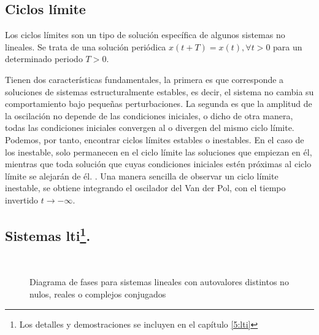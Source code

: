 \subsection{Ciclos límite}
Los ciclos límites son un tipo de solución específica de algunos sistemas no lineales. Se trata de una solución periódica $x(t+T) =x(t), \forall t>0$ para un determinado periodo  $T>0$. 

Tienen dos características fundamentales, la primera es que corresponde a soluciones de sistemas estructuralmente estables, es decir, el sistema no cambia su comportamiento bajo pequeñas perturbaciones. La segunda es que la amplitud de la oscilación no depende de las condiciones iniciales, o dicho  de otra manera, todas las condiciones iniciales convergen al o divergen del mismo ciclo límite. Podemos, por tanto, encontrar ciclos límites estables o inestables. En el caso de los inestable, solo permanecen en el ciclo límite las soluciones que empiezan en él, mientras que toda solución que cuyas condiciones iniciales estén próximas al ciclo límite se alejarán de él. . Una manera sencilla de observar un ciclo límite inestable, se obtiene integrando el oscilador del Van der Pol, con el tiempo invertido $t\to -\infty$.





\subsection{Sistemas lti\protect\footnote{Los detalles y demostraciones se incluyen en el capítulo \ref{5:lti}}. }

\begin{figure}[h] 
\\
\caption{Diagrama de fases para sistemas lineales con autovalores distintos no nulos, reales o complejos conjugados}\label{fig:lin1}
\end{figure}

